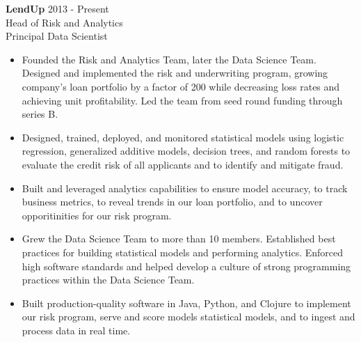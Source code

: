 \documentclass[9pt]{article}
\newenvironment{changemargin}[2]{%
  \begin{list}{}{%
    \setlength{\topsep}{0pt}%
    \setlength{\leftmargin}{#1}%
    \setlength{\rightmargin}{#2}%
    \setlength{\listparindent}{\parindent}%
    \setlength{\itemindent}{\parindent}%
    \setlength{\parsep}{\parskip}%
  }%
  \item[]}{\end{list}
}
\newenvironment{body} {
  \vspace*{-16pt}
\begin{changemargin}{-0.25in}{-0.5in}
  }
{\end{changemargin}
}
\begin{document}
\begin{body}

  \vspace{14pt}

  \textbf{LendUp} \hfill 2013 - Present \\
  Head of Risk and Analytics \\
  Principal Data Scientist
  \begin{itemize}


    \item Founded the Risk and Analytics Team, later the Data Science Team.  Designed and implemented the risk and underwriting program, growing company's loan portfolio by a factor of 200 while decreasing loss rates and achieving unit profitability.  Led the team from seed round funding through series B. \\

    \item Designed, trained, deployed, and monitored statistical models using logistic regression, generalized additive models, decision trees, and random forests to evaluate the credit risk of all applicants and to identify and mitigate fraud. \\

    \item Built and leveraged analytics capabilities to ensure model accuracy, to track business metrics, to reveal trends in our loan portfolio, and to uncover opporitinities for our risk program. %

    \item Grew the Data Science Team to more than 10 members. Established best practices for building statistical models and performing analytics.  Enforced high software standards and helped develop a culture of strong programming practices within the Data Science Team. \\

    \item Built production-quality software in Java, Python, and Clojure to implement our risk program, serve and score models statistical models, and to ingest and process data in real time. \\


\end{itemize}
\end{body}
\end{document}
